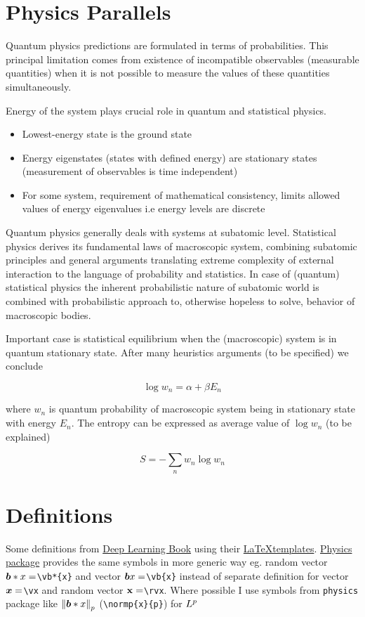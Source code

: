 \documentclass[12pt]{article}
\newcommand{\be}{\begin{equation}}
\newcommand{\ee}{\end{equation}}
\newcommand{\normp}[2]{\norm{\vb*{#1}}_#2}
\begin{document}
\newlength{\notationgap}
\setlength{\notationgap}{1pc}

\section{Physics Parallels}

Quantum physics predictions are formulated in terms of
probabilities. This principal limitation comes from existence of incompatible observables
(measurable quantities) when it is not possible to measure the values of these quantities simultaneously.

Energy of the system plays crucial role in quantum and statistical physics.
\begin{itemize}
  \item Lowest-energy state is the ground state
  \item Energy eigenstates (states with defined energy) are stationary states (measurement of observables is time independent)
  \item For some system, requirement of mathematical consistency, limits allowed values of energy eigenvalues i.e energy levels are discrete
\end{itemize}

Quantum physics generally deals with systems at subatomic level. Statistical physics derives its fundamental laws of macroscopic system, combining subatomic principles and general arguments translating extreme complexity of external interaction to the language of probability and statistics. In case of (quantum) statistical physics the inherent probabilistic nature of subatomic world is combined with probabilistic approach to, otherwise hopeless to solve, behavior of macroscopic bodies. 

Important case is statistical equilibrium when the (macroscopic) system is in quantum stationary state. After many heuristics arguments (to be specified) we conclude

\be \log w_n = \alpha + \beta E_n \ee 

where $w_n$ is quantum probability of macroscopic system being in stationary state with energy $E_n$. The entropy can be expressed as average value of $\log w_n$ (to be explained)

\be S = -\sum_n w_n \log w_n \ee

\section{Definitions}
Some definitions from \href{http://www.deeplearningbook.org/}{Deep Learning Book} using their \href{https://github.com/goodfeli/dlbook_notation}{\LaTeX templates}. \href{http://mirrors.ibiblio.org/CTAN/macros/latex/contrib/physics/physics.pdf}{Physics package} provides the same symbols in more generic way eg. random vector ${\bm{b}}*{x}=$\verb|\vb*{x}| and vector ${\bm{b}}{x}=$\verb|\vb{x}| instead of separate definition for vector ${\bm{x}}=$\verb|\vx| and random vector ${\mathbf{x}}=$\verb|\rvx|. Where possible I use symbols from \verb|physics| package like $\normp{x}{p}$ (\verb|\normp{x}{p}|) for $L^p$
\end{document}

